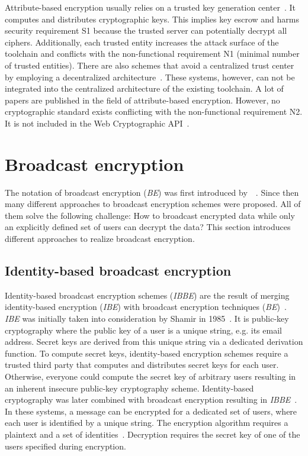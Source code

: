 \documentclass[../main.tex]{subfiles}
\begin{document}
Attribute-based encryption usually relies on a trusted key generation center~\cite{Sahai2009}.
It computes and distributes cryptographic keys.
This implies key escrow and harms security requirement S1 because the trusted server can potentially decrypt all ciphers.
Additionally, each trusted entity increases the attack surface of the toolchain and conflicts with the non-functional requirement N1 (minimal number of trusted entities).
There are also schemes that avoid a centralized trust center by employing a decentralized architecture~\cite{Vaanchig2018}.
These systems, however, can not be integrated into the centralized architecture of the existing toolchain.
A lot of papers are published in the field of attribute-based encryption.
However, no cryptographic standard exists conflicting with the non-functional requirement N2.
It is not included in the Web Cryptographic API~\cite{WebCryptoApi2017}.

\section{Broadcast encryption}
\label{sec:broadcast-encryption}

The notation of broadcast encryption (\textit{BE}) was first introduced by~\citeauthor{fiat1993broadcast}~\cite{fiat1993broadcast}. 
Since then many different approaches to broadcast encryption schemes were proposed. 
All of them solve the following challenge: 
How to broadcast encrypted data while only an explicitly defined set of users can decrypt the data?
This section introduces different approaches to realize broadcast encryption.


\subsection{Identity-based broadcast encryption} 
\label{sec:broadcast-identity}

Identity-based broadcast encryption schemes (\textit{IBBE}) are the result of merging identity-based encryption (\textit{IBE}) with broadcast encryption techniques (\textit{BE})~\cite{Sakai2007}.
\textit{IBE} was initially taken into consideration by Shamir in 1985~\cite{shamir1985}.
It is public-key cryptography where the public key of a user is a unique string, e.g. its email address. 
Secret keys are derived from this unique string via a dedicated derivation function. 
To compute secret keys, identity-based encryption schemes require a trusted third party that computes and distributes secret keys for each user.
Otherwise, everyone could compute the secret key of arbitrary users resulting in an inherent insecure public-key cryptography scheme.
Identity-based cryptography was later combined with broadcast encryption resulting in \textit{IBBE}~\cite{Sakai2007}.
In these systems, a message can be encrypted for a dedicated set of users, where each user is identified by a unique string.
The encryption algorithm requires a plaintext and a set of identities~\cite{shamir1985}.
Decryption requires the secret key of one of the users specified during encryption.
\end{document}
